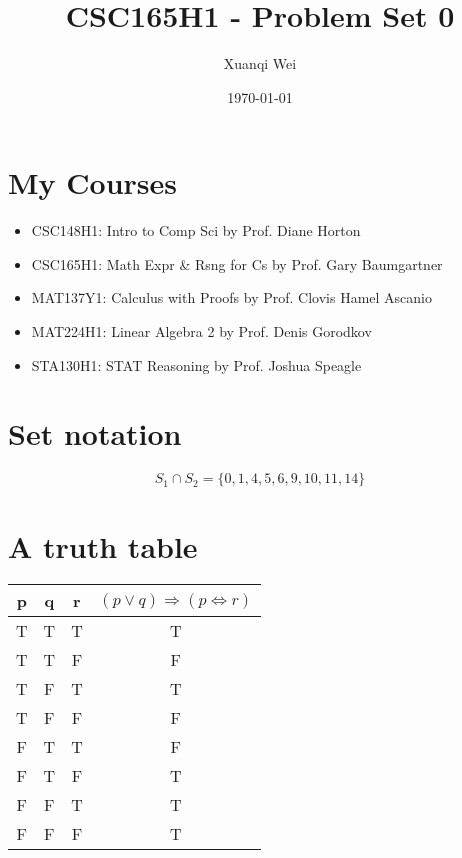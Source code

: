 \documentclass[12pt]{article}
\title{CSC165H1 - Problem Set 0}
\author{Xuanqi Wei}
\date{\today}
\begin{document}
\maketitle
\newpage

\section*{My Courses}
\begin{itemize}
	\item CSC148H1: Intro to Comp Sci by Prof. Diane Horton
	\item CSC165H1: Math Expr \& Rsng for Cs by Prof. Gary Baumgartner
	\item MAT137Y1: Calculus with Proofs by Prof. Clovis Hamel Ascanio
	\item MAT224H1: Linear Algebra 2 by Prof. Denis Gorodkov
	\item STA130H1: STAT Reasoning by Prof. Joshua Speagle
\end{itemize}


\section*{Set notation}

\[
S_1 \cap S_2 = \{0, 1, 4, 5, 6, 9, 10, 11, 14\}
\]


\section*{A truth table}

\begin{table}[h]
\centering

\begin{tabular}{|c|c|c|c|} \hline

	p & q & r & $(p\lor q)\Rightarrow (p\Leftrightarrow r)$ \\
\hline
	T & T & T & T \\
\hline
	T & T & F & F \\
\hline
	T & F & T & T \\
\hline
	T & F & F & F \\
\hline
	F & T & T & F \\
\hline
	F & T & F & T \\
\hline
	F & F & T & T \\
\hline
	F & F & F & T \\ \hline
	
\end{tabular}
\end{table}
\end{document}
